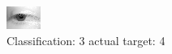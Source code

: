 \begin{figure}[h!]
\begin{center}
\includegraphics[width=0.60\columnwidth]{figures/ID2670_class_3_target_4.png}
\end{center}
\caption{ Classification: 3 actual target: 4}
\label{fig:ID2670_class_3_target_4}
\end{figure}
